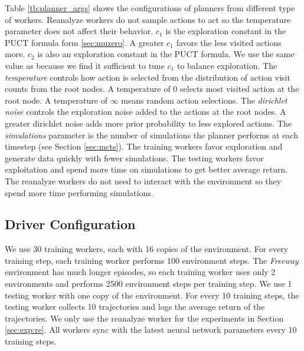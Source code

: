 Table \ref{tb:planner_args} shows the configurations of planners from different type of workers.
Reanalyze workers do not sample actions to act so the temperature parameter does not affect their behavior.
$c_1$ is the exploration constant in the PUCT formula form \ref{sec:muzero}.
A greater $c_1$ favors the less visited actions more.
$c_2$ is also an exploration constant in the PUCT formula.
We use the same value as \cite{MasteringAtariGo_Schrittwieser.Antonoglou.ea_2020} because we find it sufficient to tune $c_1$ to balance exploration.
The \textit{temperature} controls how action is selected from the distribution of action visit counts from the root nodes.
A temperature of 0 selects most visited action at the root node.
A temperature of $\infty$ means random action selections.
The \textit{dirichlet noise} controls the exploration noise added to the actions at the root nodes.
A greater dirichlet noise adds more prior probability to less explored actions.
The \textit{simulations} parameter is the number of simulations the planner performs at each timestep (see Section \ref{sec:mcts}).
The training workers favor exploration and generate data quickly with fewer simulations.
The testing workers favor exploitation and spend more time on simulations to get better average return.
The reanalyze workers do not need to interact with the environment so they spend more time performing simulations.

\subsection{Driver Configuration} \label{sec:exp:driver}
We use 30 training workers, each with 16 copies of the environment.
For every training step, each training worker performs 100 environment steps.
The \textit{Freeway} environment has much longer episodes, so each training worker uses only 2 environments and performs 2500 environment steps per training step.
We use 1 testing worker with one copy of the environment.
For every 10 training steps, the testing worker collects 10 trajectories and logs the average return of the trajectories.
We only use the reanalyze worker for the experiments in Section \ref{sec:exp:re}.
All workers sync with the latest neural network parameters every 10 training steps.

